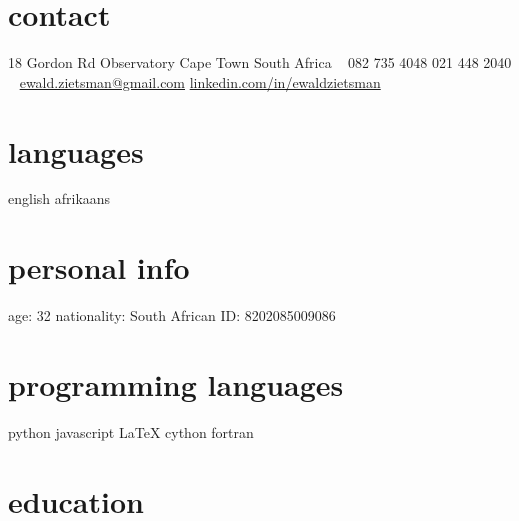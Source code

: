 \documentclass[]{friggeri-cv} %
\begin{document}


\begin{aside} %
\section{contact}
18 Gordon Rd
Observatory
Cape Town
South Africa
~
082 735 4048
021 448 2040
~
\href{mailto:ewald.zietsman@gmail.com}{ewald.zietsman@gmail.com}
\href{http://za.linkedin.com/in/ewaldzietsman/}{linkedin.com/in/ewaldzietsman}
\section{languages}
english 
afrikaans
\section{personal info}
age: 32
nationality: South African
ID: 8202085009086
\section{programming languages}
python
javascript
\LaTeX
cython
fortran
\end{aside}


\section{education}
\end{document}
